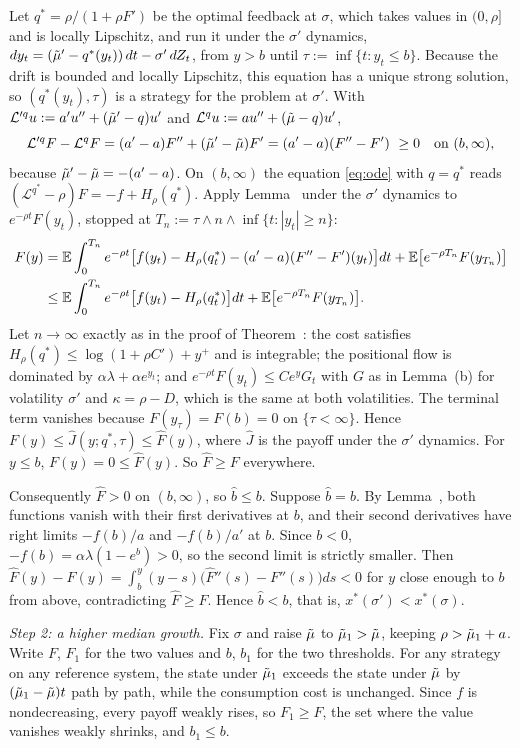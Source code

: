 Let $q^*=\rho/(1+\rho F')$ be the optimal feedback at $\sigma$, which takes values in $(0,\rho]$ and is locally Lipschitz, and run it under the $\sigma'$ dynamics, $dy_t=(\tilde\mu'-q^*(y_t))\,dt-\sigma'\,dZ_t$, from $y>b$ until $\tau:=\inf\{t:y_t\le b\}$. Because the drift is bounded and locally Lipschitz, this equation has a unique strong solution, so $(q^*(y_t),\tau)$ is a strategy for the problem at $\sigma'$. With $\mathcal L'^qu:=a'u''+(\tilde\mu'-q)u'$ and $\mathcal L^qu:=au''+(\tilde\mu-q)u'$,
\[
\mathcal L'^qF-\mathcal L^qF=(a'-a)F''+(\mut'-\mut)F'=(a'-a)(F''-F')\ \ge0\quad\text{on }(b,\infty),
\]
because $\tilde\mu'-\tilde\mu=-(a'-a)$. On $(b,\infty)$ the equation \eqref{eq:ode} with $q=q^*$ reads $(\mathcal L^{q^*}-\rho)F=-f+H_\rho(q^*)$. Apply Lemma~ under the $\sigma'$ dynamics to $e^{-\rho t}F(y_t)$, stopped at $T_n:=\tau\wedge n\wedge\inf\{t:|y_t|\ge n\}$:
\begin{align*}
F(y)&=\mathbb{E}\int_0^{T_n}e^{-\rho t}\big[f(y_t)-H_\rho(q^*_t)-(a'-a)(F''-F')(y_t)\big]dt+\mathbb{E}\big[e^{-\rho T_n}F(y_{T_n})\big]\\
&\le \mathbb{E}\int_0^{T_n}e^{-\rho t}\big[f(y_t)-H_\rho(q^*_t)\big]dt+\mathbb{E}\big[e^{-\rho T_n}F(y_{T_n})\big].
\end{align*}
Let $n\to\infty$ exactly as in the proof of Theorem~: the cost satisfies $H_\rho(q^*)\le\log(1+\rho C')+y^+$ and is integrable; the positional flow is dominated by $\alpha\lambda+\alpha e^{y_t}$; and $e^{-\rho t}F(y_t)\le Ce^yG_t$ with $G$ as in Lemma~(b) for volatility $\sigma'$ and $\kappa=\rho-D$, which is the same at both volatilities. The terminal term vanishes because $F(y_\tau)=F(b)=0$ on $\{\tau<\infty\}$. Hence $F(y)\le\hat J(y;q^*,\tau)\le\hat F(y)$, where $\hat J$ is the payoff under the $\sigma'$ dynamics. For $y\le b$, $F(y)=0\le\hat F(y)$. So $\hat F\ge F$ everywhere.

Consequently $\hat F>0$ on $(b,\infty)$, so $\hat b\le b$. Suppose $\hat b=b$. By Lemma~, both functions vanish with their first derivatives at $b$, and their second derivatives have right limits $-f(b)/a$ and $-f(b)/a'$ at $b$. Since $b<0$, $-f(b)=\alpha\lambda(1-e^b)>0$, so the second limit is strictly smaller. Then $\hat F(y)-F(y)=\int_b^y(y-s)\big(\hat F''(s)-F''(s)\big)ds<0$ for $y$ close enough to $b$ from above, contradicting $\hat F\ge F$. Hence $\hat b<b$, that is, $x^*(\sigma')<x^*(\sigma)$.

\emph{Step 2: a higher median growth.} Fix $\sigma$ and raise $\tilde\mu$ to $\tilde\mu_1>\tilde\mu$, keeping $\rho>\tilde\mu_1+a$. Write $F$, $F_1$ for the two values and $b$, $b_1$ for the two thresholds. For any strategy on any reference system, the state under $\tilde\mu_1$ exceeds the state under $\tilde\mu$ by $(\tilde\mu_1-\tilde\mu)t$ path by path, while the consumption cost is unchanged. Since $f$ is nondecreasing, every payoff weakly rises, so $F_1\ge F$, the set where the value vanishes weakly shrinks, and $b_1\le b$.

